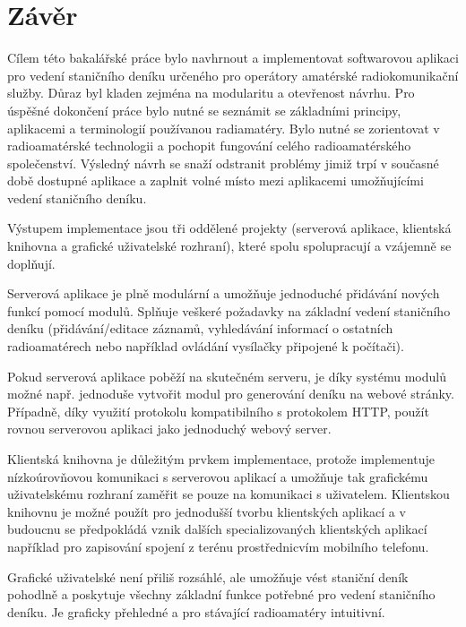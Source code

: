 \chapter{Závěr}
Cílem této bakalářské práce bylo navhrnout a implementovat softwarovou aplikaci
pro vedení staničního deníku určeného pro operátory amatérské radiokomunikační služby. Důraz byl kladen zejména
na modularitu a otevřenost návrhu. Pro úspěšné dokončení práce bylo nutné se
seznámit se 
základními principy, aplikacemi a terminologií používanou radiamatéry.
Bylo nutné se zorientovat v 
radioamatérské technologii a pochopit fungování celého radioamatérského společenství.
Výsledný návrh se snaží odstranit problémy jimiž trpí v současné době dostupné
aplikace a zaplnit volné místo mezi aplikacemi umožňujícími vedení staničního deníku.

Výstupem implementace jsou tři oddělené projekty (serverová aplikace, klientská knihovna a grafické uživatelské rozhraní),
které spolu spolupracují a vzájemně se doplňují.

Serverová aplikace je plně modulární a umožňuje jednoduché přidávání nových
funkcí pomocí modulů. Splňuje veškeré požadavky na základní vedení staničního deníku (přidávání/editace záznamů, vyhledávání 
informací o ostatních radioamatérech nebo například ovládání vysílačky připojené k počítači).

Pokud serverová aplikace poběží na skutečném serveru, je díky systému modulů
možné např. jednoduše vytvořit modul
pro generování deníku na webové stránky. Případně, díky využití protokolu kompatibilního s protokolem HTTP, použít rovnou
serverovou aplikaci jako jednoduchý webový server.

Klientská knihovna je důležitým prvkem implementace, protože implementuje nízkoúrovňovou komunikaci s serverovou aplikací
a umožňuje tak grafickému uživatelskému rozhraní zaměřit se pouze na komunikaci s uživatelem. Klientskou knihovnu
je možné použít pro jednodušší tvorbu klientských aplikací a v budoucnu se předpokládá vznik dalších specializovaných
klientských aplikací například pro zapisování spojení z terénu prostřednicvím mobilního telefonu.

Grafické uživatelské není přiliš rozsáhlé, ale umožňuje vést staniční deník pohodlně a poskytuje všechny základní funkce potřebné
pro vedení staničního deníku. Je graficky přehledné a pro stávající radioamatéry intuitivní.

